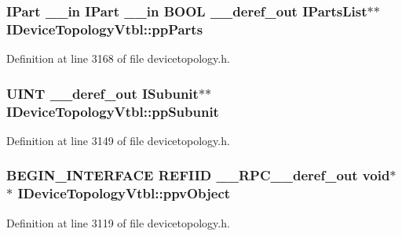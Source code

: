 \subsubsection[{\texorpdfstring{pp\+Parts}{ppParts}}]{ {\bf I\+Part} {\bf \+\_\+\+\_\+in} {\bf I\+Part} {\bf \+\_\+\+\_\+in} {\bf B\+O\+OL} {\bf \+\_\+\+\_\+deref\+\_\+out} {\bf I\+Parts\+List}$\ast$$\ast$ I\+Device\+Topology\+Vtbl\+::pp\+Parts}\hypertarget{struct_i_device_topology_vtbl_acf45e61a7c1d6bc12cc836d1424c8562}{}\label{struct_i_device_topology_vtbl_acf45e61a7c1d6bc12cc836d1424c8562}


Definition at line 3168 of file devicetopology.\+h.

\subsubsection[{\texorpdfstring{pp\+Subunit}{ppSubunit}}]{ {\bf U\+I\+NT} {\bf \+\_\+\+\_\+deref\+\_\+out} {\bf I\+Subunit}$\ast$$\ast$ I\+Device\+Topology\+Vtbl\+::pp\+Subunit}\hypertarget{struct_i_device_topology_vtbl_af968531344327d34c13d269c427ed515}{}\label{struct_i_device_topology_vtbl_af968531344327d34c13d269c427ed515}


Definition at line 3149 of file devicetopology.\+h.

\subsubsection[{\texorpdfstring{ppv\+Object}{ppvObject}}]{\setlength{\rightskip}{0pt plus 5cm}B\+E\+G\+I\+N\+\_\+\+I\+N\+T\+E\+R\+F\+A\+CE {\bf R\+E\+F\+I\+ID} {\bf \+\_\+\+\_\+\+R\+P\+C\+\_\+\+\_\+deref\+\_\+out} {\bf void}$\ast$$\ast$ I\+Device\+Topology\+Vtbl\+::ppv\+Object}\hypertarget{struct_i_device_topology_vtbl_a5fbda440ff0cbc0e9723c9fb5c84eac2}{}\label{struct_i_device_topology_vtbl_a5fbda440ff0cbc0e9723c9fb5c84eac2}


Definition at line 3119 of file devicetopology.\+h.

